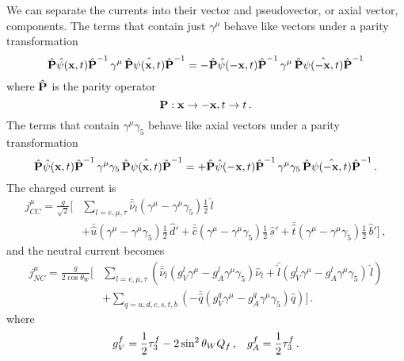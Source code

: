   We can separate the currents into their vector and pseudovector, or axial
  vector, components. The terms that contain just $\gamma^{\mu}$ behave like
  vectors under a parity transformation~\cite{Alberico:2001sd}
  \begin{equation}
    \hat{\textrm{\textbf{P}}}\hat{\psi}(\textbf{x},t)\hat{\textrm{\textbf{P}}}^{-1} \, 
      \gamma^{\mu} \, \hat{\textrm{\textbf{P}}}\hat{\psi(\textbf{x},t)}\hat{\textrm{\textbf{P}}}^{-1} 
      = - \hat{\textrm{\textbf{P}}}\hat{\psi}(-\textbf{x},t)\hat{\textrm{\textbf{P}}}^{-1} \, 
      \gamma^{\mu} \, \hat{\textrm{\textbf{P}}}\hat{\psi(-\textbf{x},t)}\hat{\textrm{\textbf{P}}}^{-1}
  \end{equation}
  where $\hat{\textrm{\textbf{P}}}$ is the parity operator
  \begin{equation}
    \textrm{\textbf{P}}: \textbf{x} \rightarrow -\textbf{x}, t \rightarrow t \,.
  \end{equation}
  The terms that contain $\gamma^{\mu}\gamma_{5}$ behave like axial vectors
  under a parity transformation
  \begin{equation}
    \hat{\textrm{\textbf{P}}}\hat{\psi}(\textbf{x},t)\hat{\textrm{\textbf{P}}}^{-1} \, 
      \gamma^{\mu}\gamma_5 \, \hat{\textrm{\textbf{P}}}\hat{\psi(\textbf{x},t)}\hat{\textrm{\textbf{P}}}^{-1} 
      = + \hat{\textrm{\textbf{P}}}\hat{\psi}(-\textbf{x},t)\hat{\textrm{\textbf{P}}}^{-1} \, 
      \gamma^{\mu}\gamma_5 \, \hat{\textrm{\textbf{P}}}\hat{\psi(-\textbf{x},t)}\hat{\textrm{\textbf{P}}}^{-1}
      \,.
  \end{equation}
  The charged current is
  \begin{equation}
    \begin{aligned}
    j^{\mu}_{CC} = \frac{g}{\sqrt{2}}\Bigg[&\sum_{l=e,\mu,\tau} \bar{\hat{\nu}}_l (\gamma^{\mu} 
          - \gamma^{\mu}\gamma_5)\frac{1}{2}\,\hat{l} \\
      &+ \bar{\hat{u}}(\gamma^{\mu} - \gamma^{\mu}\gamma_5)\frac{1}{2}\, \hat{d}'
      + \bar{\hat{c}}(\gamma^{\mu} - \gamma^{\mu}\gamma_5)\frac{1}{2}\, \hat{s}'
      + \bar{\hat{t}}(\gamma^{\mu} - \gamma^{\mu}\gamma_5)\frac{1}{2}\, \hat{b}' \Bigg] \,,
    \end{aligned}
  \end{equation}
  and the neutral current becomes
  \begin{equation}
    \begin{aligned}
        j^{\mu}_{NC} = \frac{g}{2\cos\theta_W} \Bigg[&\sum_{l=e,\mu,\tau} 
        \left(\bar{\hat{\nu}}_{l}(g_V^{l} \gamma^{\mu}- g_A^{l} \gamma^{\mu}\gamma_5) \hat{\nu}_{l} 
         + \bar{\hat{l}}(g_V^{l} \gamma^{\mu}- g_A^{l} \gamma^{\mu}\gamma_5)\, \hat{l} \right) \\
        &+ \sum_{q=u,d,c,s,t,b} 
         \left(- \bar{\hat{q}} (g_V^{q} \gamma^{\mu}-g_A^{q} \gamma^{\mu}\gamma_5)\hat{q} \right)\Bigg] \,.
     \end{aligned}
  \end{equation}
  where 
  \begin{equation}
    g_V^{f} = \frac{1}{2}\tau_3^{f} - 2\sin^2\theta_W Q_f \,,
    \hspace{3mm}
    g_A^{f} = \frac{1}{2}\tau_3^{f} \,.
  \end{equation}

